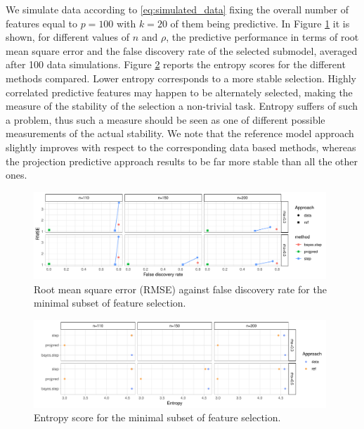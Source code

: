 \documentclass[american,]{article}
\theoremstyle{definition}
\begin{document}
We simulate data according to \eqref{eq:simulated_data} fixing the overall number of 
features equal to $p=100$ with $k=20$ of them being predictive. In Figure \ref{fig:rmse_vs_fdr} 
it is shown, for different values of $n$ and $\rho$, the predictive performance in terms of 
root mean square error and the false discovery rate of the selected submodel, averaged after 100 data simulations.
Figure \ref{fig:entropy} reports the entropy scores for the different methods compared. Lower entropy corresponds to
a more stable selection. Highly correlated predictive features may happen to be alternately selected, making the measure of
the stability of the selection a non-trivial task. Entropy suffers of such a problem, thus such a measure should be seen
as one of different possible measurements of the actual stability. We note that the reference model approach slightly improves 
with respect to the corresponding data based methods, whereas the projection predictive approach results to be far more stable
than all the other ones.


\begin{figure}[tp]
  \centering
  \includegraphics[width=0.98\textwidth]{graphics/rmse_vs_fdr.pdf}
  \caption{Root mean square error (RMSE) against false discovery rate for the minimal subset of feature selection.\\}
  \label{fig:rmse_vs_fdr}
\end{figure}

\begin{figure}[tp]
  \centering
  \includegraphics[width=0.98\textwidth]{graphics/entropy.pdf}
  \caption{Entropy score for the minimal subset of feature selection.\\}
  \label{fig:entropy}
\end{figure}
\end{document}
